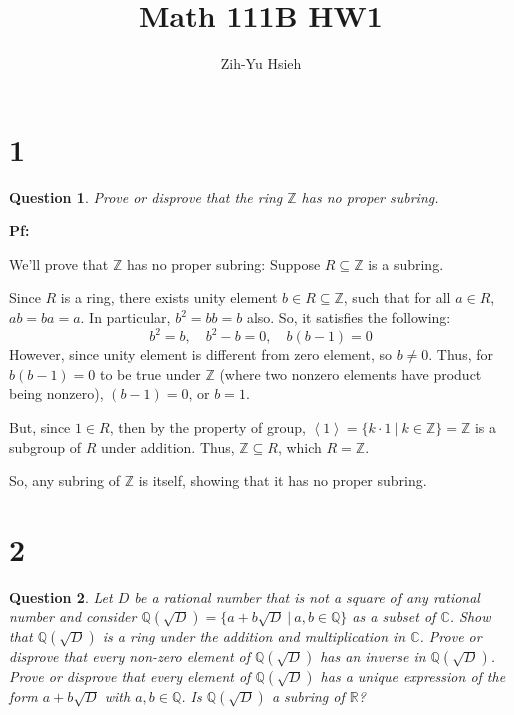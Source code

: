 \documentclass{article}
\title{Math 111B HW1}
\author{Zih-Yu Hsieh}
\newtheorem{question}{Question}
\begin{document}
\maketitle

\section*{1}
\begin{question}
    Prove or disprove that the ring $\mathbb{Z}$ has no proper subring.
\end{question}

\textbf{Pf:}

We'll prove that $\mathbb{Z}$ has no proper subring: Suppose $R\subseteq \mathbb{Z}$ is a subring.

\hfill

Since $R$ is a ring, there exists unity element $b\in R\subseteq \mathbb{Z}$, such that for all $a\in R$,
$ab=ba=a$. In particular, $b^2=bb=b$ also. So, it satisfies the following:
$$b^2=b,\quad b^2-b=0,\quad b(b-1)=0$$
However, since unity element is different from zero element, so $b\neq 0$. Thus, for $b(b-1)=0$ to be true under $\mathbb{Z}$ (where two nonzero elements have product being nonzero),
$(b-1)=0$, or $b=1$.

\hfill

But, since $1\in R$, then by the property of group, $\left<1\right> = \{k\cdot 1\ |\ k\in\mathbb{Z}\} = \mathbb{Z}$ is a subgroup of $R$ under addition.
Thus, $\mathbb{Z}\subseteq R$, which $R=\mathbb{Z}$.

So, any subring of $\mathbb{Z}$ is itself, showing that it has no proper subring.

\break

\section*{2}
\begin{question}
    Let $D$ be a rational number that is not a square of any rational number and consider
    $\mathbb{Q}(\sqrt{D})=\{a+b\sqrt{D}\ |\ a,b\in\mathbb{Q}\}$ as a subset of $\mathbb{C}$. 
    Show that $\mathbb{Q}(\sqrt{D})$ is a ring under the addition and multiplication in $\mathbb{C}$. 
    Prove or disprove that every non-zero element of $\mathbb{Q}(\sqrt{D})$ has an inverse in $\mathbb{Q}(\sqrt{D})$. 
    Prove or disprove that every element of $\mathbb{Q}(\sqrt{D})$ has a unique expression of the form 
    $a+b\sqrt{D}$ with $a,b\in\mathbb{Q}$. Is $\mathbb{Q}(\sqrt{D})$ a subring of $\mathbb{R}$?
\end{question}
\end{document}
